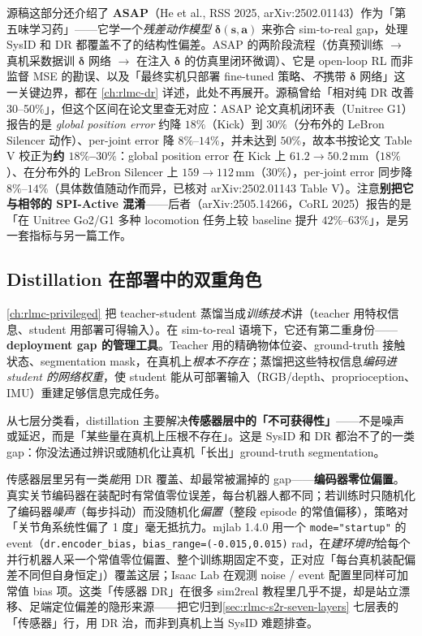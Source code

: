 源稿这部分还介绍了 \textbf{ASAP}（He et al., RSS 2025, arXiv:2502.01143）作为「第五味学习药」——它学一个\emph{残差动作模型} $\boldsymbol\delta(\mathbf s,\mathbf a)$ 来弥合 sim-to-real gap，处理 SysID 和 DR 都覆盖不了的结构性偏差。ASAP 的两阶段流程（仿真预训练 $\to$ 真机采数据训 $\boldsymbol\delta$ 网络 $\to$ 在注入 $\boldsymbol\delta$ 的仿真里闭环微调）、它是 open-loop RL 而非监督 MSE 的勘误、以及「最终实机只部署 fine-tuned 策略、\emph{不}携带 $\boldsymbol\delta$ 网络」这一关键边界，都在 \cref{ch:rlmc-dr} 详述，此处不再展开。源稿曾给「相对纯 DR 改善 30--50\%」，但这个区间在论文里查无对应：ASAP 论文真机闭环表（Unitree G1）报告的是 \emph{global position error} 约降 $18\%$（Kick）到 $30\%$（分布外的 LeBron Silencer 动作）、per-joint error 降 $8\%$--$14\%$，并未达到 $50\%$，故本书按论文 Table V 校正为\textbf{约 $18\%$--$30\%$}：global position error 在 Kick 上 $61.2\!\to\!50.2$\,mm（$18\%$）、在分布外的 LeBron Silencer 上 $159\!\to\!112$\,mm（$30\%$），per-joint error 同步降 $8\%$--$14\%$（具体数值随动作而异，已核对 arXiv:2502.01143 Table V）。注意\textbf{别把它与相邻的 SPI-Active 混淆}——后者（arXiv:2505.14266，CoRL 2025）报告的是「在 Unitree Go2/G1 多种 locomotion 任务上较 baseline 提升 $42\%$--$63\%$」，是另一套指标与另一篇工作。

\subsection{Distillation 在部署中的双重角色}
\label{sec:rlmc-s2r-distill}

\cref{ch:rlmc-privileged} 把 teacher-student 蒸馏当成\emph{训练技术}讲（teacher 用特权信息、student 用部署可得输入）。在 sim-to-real 语境下，它还有第二重身份——\textbf{deployment gap 的管理工具}。Teacher 用的精确物体位姿、ground-truth 接触状态、segmentation mask，在真机上\emph{根本不存在}；蒸馏把这些特权信息\emph{编码进 student 的网络权重}，使 student 能从可部署输入（RGB/depth、proprioception、IMU）重建足够信息完成任务。

从七层分类看，distillation 主要解决\textbf{传感器层中的「不可获得性」}——不是噪声或延迟，而是「某些量在真机上压根不存在」。这是 SysID 和 DR 都治不了的一类 gap：你没法通过辨识或随机化让真机「长出」ground-truth segmentation。

\begin{finenote}
传感器层里另有一类\emph{能}用 DR 覆盖、却最常被漏掉的 gap——\textbf{编码器零位偏置}。真实关节编码器在装配时有常值零位误差，每台机器人都不同；若训练时只随机化了编码器\emph{噪声}（每步抖动）而没随机化\emph{偏置}（整段 episode 的常值偏移），策略对「关节角系统性偏了 1 度」毫无抵抗力。mjlab 1.4.0 用一个 \verb|mode="startup"| 的 event（\texttt{dr.encoder\_bias}，\verb|bias_range=(-0.015,0.015)| rad，在\emph{建环境时}给每个并行机器人采一个常值零位偏置、整个训练期固定不变，正对应「每台真机装配偏差不同但自身恒定」）覆盖这层；Isaac Lab 在观测 noise / event 配置里同样可加常值 bias 项。这类「传感器 DR」在很多 sim2real 教程里几乎不提，却是站立漂移、足端定位偏差的隐形来源——把它归到\cref{sec:rlmc-s2r-seven-layers} 七层表的「传感器」行，用 DR 治，而非到真机上当 SysID 难题排查。
\end{finenote}

